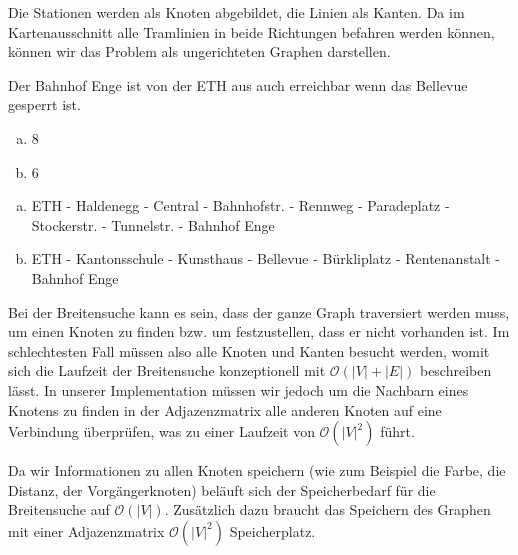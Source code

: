 \begin{lsg}
Die Stationen werden als Knoten abgebildet, die Linien als Kanten. Da im Kartenausschnitt alle Tramlinien in beide Richtungen befahren werden k\"onnen, k\"onnen wir das Problem als ungerichteten Graphen darstellen.
\end{lsg}

\begin{lsg}
Der Bahnhof Enge ist von der ETH aus auch erreichbar wenn das Bellevue gesperrt ist.
\end{lsg}

\begin{lsg}
\hfill
\begin{enumerate}[(a)]
\item 8
\item 6
\end{enumerate}\end{lsg}

\begin{lsg}
\hfill
\begin{enumerate}[(a)]
\item ETH - Haldenegg - Central - Bahnhofstr. - Rennweg - Paradeplatz - Stockerstr. - Tunnelstr. - Bahnhof Enge
\item ETH - Kantonsschule - Kunsthaus - Bellevue - B\"urkliplatz - Rentenanstalt - Bahnhof Enge
\end{enumerate}\end{lsg}

\begin{lsg}
Bei der Breitensuche kann es sein, dass der ganze Graph traversiert werden muss, um einen Knoten zu finden bzw. um festzustellen, dass er nicht vorhanden ist. Im schlechtesten Fall m\"ussen also alle Knoten und Kanten besucht werden, womit sich die Laufzeit der Breitensuche konzeptionell mit $\mathcal{O}(|V| + |E|)$ beschreiben l\"asst. In unserer Implementation m\"ussen wir jedoch um die Nachbarn eines Knotens zu finden in der Adjazenzmatrix alle anderen Knoten auf eine Verbindung \"uberpr\"ufen, was zu einer Laufzeit von $\mathcal{O}(|V|^2)$ f\"uhrt.
\end{lsg}

\begin{lsg}
Da wir Informationen zu allen Knoten speichern (wie zum Beispiel die Farbe, die Distanz, der Vorg\"angerknoten) bel\"auft sich der Speicherbedarf f\"ur die Breitensuche auf  $\mathcal{O}(|V|)$. Zus\"atzlich dazu braucht das Speichern des Graphen mit einer Adjazenzmatrix $\mathcal{O}(|V|^2)$ Speicherplatz.
\end{lsg}




